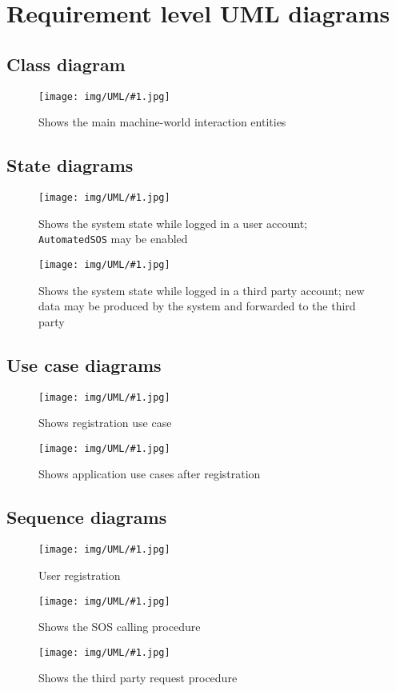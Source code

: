 \newcommand{\fetchUML}[4] {
  \begin{figure}[h!]
    \centering
    \hspace*{-#4cm}
    \texttt{[image: img/UML/\#1.jpg]}
    \caption{#2}
    \label{fig:#1}
  \end{figure}
}

\section{Requirement level UML diagrams}
\label{sec:graph}

  \subsection{Class diagram}
    \fetchUML
      {RequirementLevelClassDiagram}
      {Shows the main machine-world interaction entities}
      {1}           %
      {0}           %

  \clearpage
  \subsection{State diagrams}

    \fetchUML
      {UserStateDiagram}
      {Shows the system state while logged in a user account; \texttt{AutomatedSOS} may be enabled}
      {0.6}           %
      {0}           %

    \fetchUML
      {ThirdPartyStateDiagram}
      {Shows the system state while logged in a third party account; new data may be produced by the system and forwarded to the third party}
      {0.6}           %
      {0}           %

  \clearpage
  \subsection{Use case diagrams}

    \fetchUML
      {SignIn}
      {Shows registration use case}
      {1}           %
      {2}           %

    \fetchUML
      {NormalBehaviour}
      {Shows application use cases after registration}
      {1}           %
      {2}           %

  \clearpage
  \subsection{Sequence diagrams}

    \fetchUML
      {Seq_UserRegistration}
      {User registration}
      {.5}           %
      {0}           %

    \fetchUML
      {Seq_Ambulance}
      {Shows the SOS calling procedure}
      {.7}           %
      {0}           %

    \fetchUML
      {Seq_ThirdPartyRequest}
      {Shows the third party request procedure}
      {.7}           %
      {0}           %
